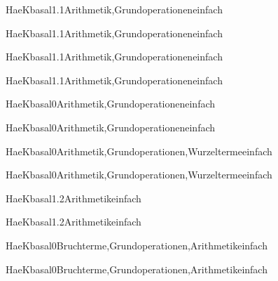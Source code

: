 \documentclass[12pt]{article}
\begin{document}
\begin{Add}{HaeK}{basal1.1}{Arithmetik,Grundoperationen}{einfach}
\solution{ }
\end{Add}
\begin{Add}{HaeK}{basal1.1}{Arithmetik,Grundoperationen}{einfach}
\end{Add}

\begin{Add}{HaeK}{basal1.1}{Arithmetik,Grundoperationen}{einfach}
\solution{ }
\end{Add}
\begin{Add}{HaeK}{basal1.1}{Arithmetik,Grundoperationen}{einfach}
\end{Add}

\begin{Add}{HaeK}{basal0}{Arithmetik,Grundoperationen}{einfach}
\solution{ }
\end{Add}
\begin{Add}{HaeK}{basal0}{Arithmetik,Grundoperationen}{einfach}
\end{Add}

\begin{Add}{HaeK}{basal0}{Arithmetik,Grundoperationen,Wurzelterme}{einfach}
\solution{ }
\end{Add}
\begin{Add}{HaeK}{basal0}{Arithmetik,Grundoperationen,Wurzelterme}{einfach}
\end{Add}

\begin{Add}{HaeK}{basal1.2}{Arithmetik}{einfach}
\solution{ }
\end{Add}
\begin{Add}{HaeK}{basal1.2}{Arithmetik}{einfach}
\end{Add}

            \begin{Add}{HaeK}{basal0}{Bruchterme,Grundoperationen,Arithmetik}{einfach}
            \solution{ }
            \end{Add}
            \begin{Add}{HaeK}{basal0}{Bruchterme,Grundoperationen,Arithmetik}{einfach}
            \end{Add}
            
\end{document}
